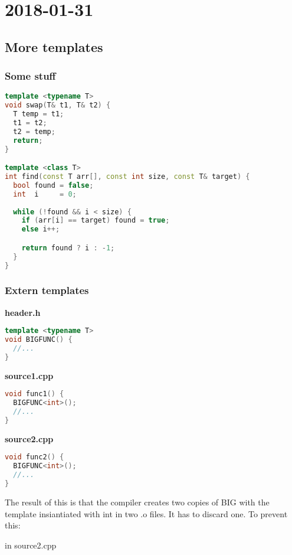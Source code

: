 \section{2018-01-31}

\subsection{More templates}

\subsubsection{Some stuff}

\begin{lstlisting}[language=C++]
template <typename T>
void swap(T& t1, T& t2) {
  T temp = t1;
  t1 = t2;
  t2 = temp;
  return;
}

template <class T>
int find(const T arr[], const int size, const T& target) {
  bool found = false;
  int  i     = 0;
  
  while (!found && i < size) {
    if (arr[i] == target) found = true;
    else i++;

    return found ? i : -1;
  }
}
\end{lstlisting}


\subsubsection{Extern templates}

\textbf{header.h}

\begin{lstlisting}[language=C++]
template <typename T>
void BIGFUNC() {
  //...
}
\end{lstlisting}

\textbf{source1.cpp}

\begin{lstlisting}[language=C++]
void func1() {
  BIGFUNC<int>();  
  //...
}
\end{lstlisting}

\textbf{source2.cpp}

\begin{lstlisting}[language=C++]
void func2() {
  BIGFUNC<int>();  
  //...
}
\end{lstlisting}

The result of this is that the compiler creates two copies of BIG with the template insiantiated with int in two .o files. It has to discard one. To prevent this:

in source2.cpp

